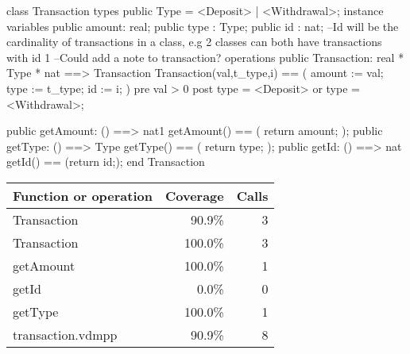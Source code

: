 \documentclass[a4paper]{article}
\begin{document}
\title{}
\author{}
\begin{vdm_al}

class Transaction
types
    public Type = <Deposit> | <Withdrawal>;
instance variables
    public amount: real;
    public type : Type; 
    public id : nat; --Id will be the cardinality of transactions in a class, e.g 2 classes can both have transactions with id 1
    --Could add a note to transaction?
operations
    public Transaction: real * Type * nat ==> Transaction
    Transaction(val,t_type,i) == (
        amount := val;
        type := t_type;
        id := i;
    )
    pre val > 0
    post type = <Deposit> or type = <Withdrawal>;

    public getAmount: () ==> nat1
    getAmount() == (
        return amount;
    );
    public getType: () ==> Type
    getType() == (
        return type;
    );
    public getId: () ==> nat
    getId() == (return id;);
end Transaction
\end{vdm_al}
\bigskip
\begin{longtable}{|l|r|r|}
\hline
Function or operation & Coverage & Calls \\
\hline
\hline
Transaction & 90.9\% & 3 \\
\hline
Transaction & 100.0\% & 3 \\
\hline
getAmount & 100.0\% & 1 \\
\hline
getId & 0.0\% & 0 \\
\hline
getType & 100.0\% & 1 \\
\hline
\hline
transaction.vdmpp & 90.9\% & 8 \\
\hline
\end{longtable}
\end{document}
